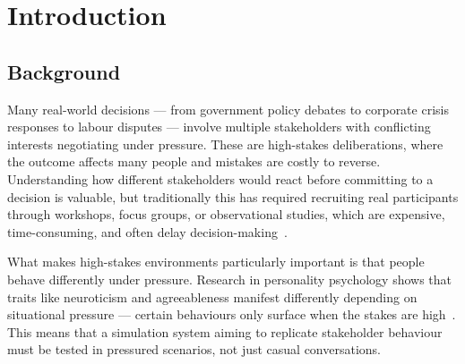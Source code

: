 \documentclass[12pt, a4paper]{report}
\begin{document}
\pagebreak
{}
\tableofcontents

\pagebreak
{}
\listoffigures

\pagebreak
{}
\listoftables


\cleardoublepage
{}


\chapter{Introduction}

\section{Background}

Many real-world decisions --- from government policy debates to corporate crisis responses to labour disputes --- involve multiple stakeholders with conflicting interests negotiating under pressure. These are high-stakes deliberations, where the outcome affects many people and mistakes are costly to reverse. Understanding how different stakeholders would react before committing to a decision is valuable, but traditionally this has required recruiting real participants through workshops, focus groups, or observational studies, which are expensive, time-consuming, and often delay decision-making~\cite{anggraeni2019cost, ceq2024}.

What makes high-stakes environments particularly important is that people behave differently under pressure. Research in personality psychology shows that traits like neuroticism and agreeableness manifest differently depending on situational pressure --- certain behaviours only surface when the stakes are high~\cite{byrne2015chokes, green2019personality}. This means that a simulation system aiming to replicate stakeholder behaviour must be tested in pressured scenarios, not just casual conversations.
\end{document}
